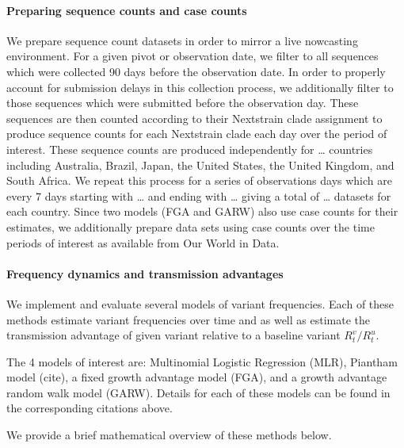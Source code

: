\documentclass[11pt,oneside,letterpaper]{article}
\begin{document}
\paragraph{Preparing sequence counts and case counts}

We prepare sequence count datasets in order to mirror a live nowcasting environment. 
For a given pivot or observation date, we filter to all sequences which were collected 90 days before the observation date. 
In order to properly account for submission delays in this collection process, we additionally filter to those sequences which were submitted before the observation day.
These sequences are then counted according to their Nextstrain clade assignment to produce sequence counts for each Nextstrain clade each day over the period of interest. 
These sequence counts are produced independently for … countries including Australia, Brazil, Japan, the United States, the United Kingdom, and South Africa.
We repeat this process for a series of observations days which are every 7 days starting with … and ending with … giving a total of … datasets for each country.
Since two models (FGA and GARW) also use case counts for their estimates, we additionally prepare data sets using case counts over the time periods of interest as available from Our World in Data.

\paragraph{Frequency dynamics and transmission advantages}%

We implement and evaluate several models of variant frequencies.
Each of these methods estimate variant frequencies over time and as well as estimate the transmission advantage of given variant relative to a baseline variant $R_{t}^{v} / R_{t}^{u}$.

The 4 models of interest are: Multinomial Logistic Regression (MLR), Piantham model (cite), a fixed growth advantage model (FGA), and a growth advantage random walk model (GARW). 
Details for each of these models can be found in the corresponding citations above.

We provide a brief mathematical overview of these methods below.
\end{document}
